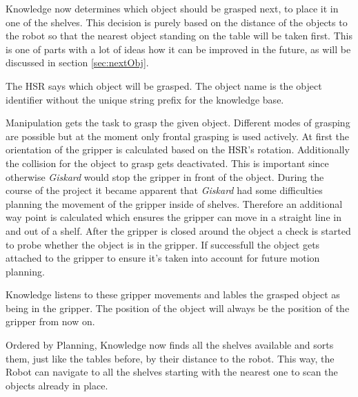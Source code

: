 \documentclass[main.tex]{subfiles}
\begin{document}
	\label{grasp-object}
	\begin{knowledge}
	Knowledge now determines which object should be grasped next, to place it in one of the shelves. This decision is purely based on the distance of the objects to the robot so that the nearest object standing on the table will be taken first. This is one of parts with a lot of ideas how it can be improved in the future, as will be discussed in section \ref{sec:nextObj}.
	\end{knowledge}
	
	\begin{nlp}
	The HSR says which object will be grasped. The object name is the object identifier without the unique string prefix for the knowledge base.
	\end{nlp}
	
	\begin{manipulation}
	Manipulation gets the task to grasp the given object. Different modes of grasping are possible but at the moment only frontal grasping is used actively. At first the orientation of the gripper is calculated based on the HSR's rotation. Additionally the collision for the object to grasp gets deactivated. This is important since otherwise \textit{Giskard} would stop the gripper in front of the object. During the course of the project it became apparent that \textit{Giskard} had some difficulties planning the movement of the gripper inside of shelves. Therefore an additional way point is calculated which ensures the gripper can move in a straight line in and out of a shelf. After the gripper is closed around the object a check is started to probe whether the object is in the gripper. If successfull the object gets attached to the gripper to ensure it's taken into account for future motion planning.   
	\end{manipulation}
	
	\begin{knowledge}
	Knowledge listens to these gripper movements and lables the grasped object as being in the gripper. The position of the object will always be the position of the gripper from now on.
	
	Ordered by Planning, Knowledge now finds all the shelves available and sorts them, just like the tables before, by their distance to the robot. This way, the Robot can navigate to all the shelves starting with the nearest one to scan the objects already in place.
	\end{knowledge}
	
\end{document}

